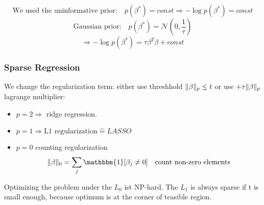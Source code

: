 \documentclass[11pt]{article}
\DeclarePairedDelimiter\norm{\lVert}{\rVert}
\begin{document}
    \begin{equation*}
      \text{We used the uninformative prior:} \quad p(\beta^*)=const \Rightarrow -\log p(\beta^*)=const
    \end{equation*}
    \begin{equation*}
      \text{Gaussian prior:} \quad p(\beta^*)=\mathcal{N}(0, \frac{1}{\tau})
    \end{equation*}
    \begin{equation*}
      \Rightarrow -\log p(\beta^*)= \tau\beta^T\beta+const
    \end{equation*}
    \subsubsection{Sparse Regression}
    We change the regularization term: either use threshhold $\norm{\beta}_p \leq t$ or use
    $+\tau \norm{\beta}_p$ lagrange multiplier:
    \begin{itemize}
      \item $p=2 \Rightarrow$ ridge regression.
      \item $p=1 \Rightarrow \text{L1 regularization} \widehat{=} LASSO$
      \item $p=0$ counting regularization
      \begin{equation*}
        \norm{\beta}_0=\sum_j\mathbbm{1}[\beta_j\neq 0] \quad \text{count non-zero elements}
      \end{equation*}
    \end{itemize}
    Optimizing the problem under the $L_0$ ist NP-hard. The $L_1$ is always sparse
    if t is small enough, because optimum is at the corner of teasible region.
\end{document}

